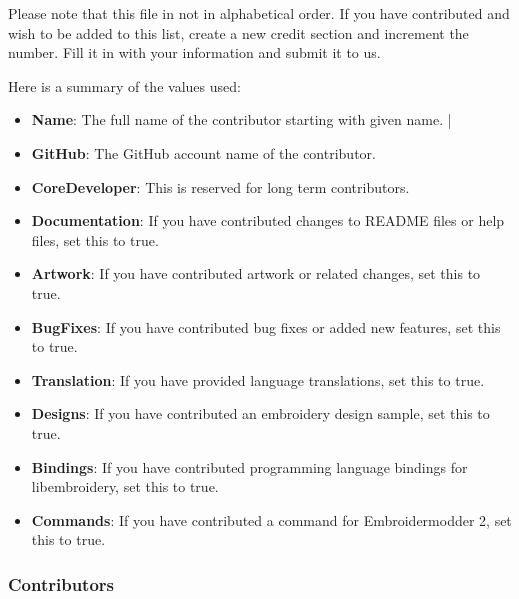 \documentclass[11pt]{report}
\begin{document}
Please note that this file in not in alphabetical order. If you have contributed and wish to be added to this list, create a new credit section and increment the number. Fill it in with your information and submit it to us.

Here is a summary of the values used:

\begin{itemize}
\item \textbf{Name}: The full name of the contributor starting with given name.                                        |
\item \textbf{GitHub}: The GitHub account name of the contributor.
\item \textbf{CoreDeveloper}: This is reserved for long term contributors.
\item \textbf{Documentation}: If you have contributed changes to README files or
    help files, set this to true.
\item \textbf{Artwork}: If you have contributed artwork or related changes, set
    this to true.
\item \textbf{BugFixes}: If you have contributed bug fixes or added new
    features, set this to true.
\item \textbf{Translation}: If you have provided language translations, set this to true.
\item \textbf{Designs}: If you have contributed an embroidery design sample, set this to true.
\item \textbf{Bindings}: If you have contributed programming language
    bindings for libembroidery, set this to true.
\item \textbf{Commands}: If you have contributed a command for Embroidermodder 2, set this to true.
\end{itemize}

\subsubsection{Contributors}
\end{document}

